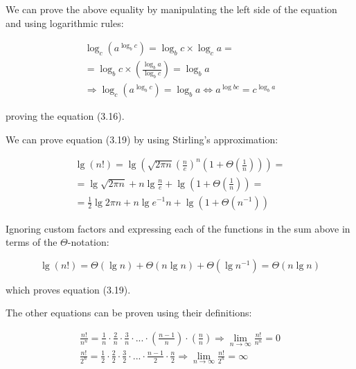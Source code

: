 \documentclass[8pt,a4paper]{article}
\begin{document}
We can prove the above equality by manipulating the left side of the equation and
using logarithmic rules:

\begin{equation*}
  \begin{split}
    \log_{c}(a^{\log_{b}c}) = \log_{b}c \times \log_{c}a = \\
    = \log_{b}c \times \left(\frac{\log_{b}a}{\log_{b}c}\right) = \log_{b}a \\
    \Rightarrow \log_{c}(a^{\log_{b}c}) = \log_{b}a \iff a^{\log{b}c} = c^{\log_{b}a}
  \end{split}
\end{equation*}

proving the equation (3.16).


We can prove equation (3.19) by using Stirling's approximation:

\begin{equation*}
  \begin{split}
    \lg(n!) = \lg \left(\sqrt{2 \pi n} \left(\frac{n}{e}\right)^{n} \left(1 + \Theta \left(\frac{1}{n}\right)\right)\right) = \\
    = \lg \sqrt{2 \pi n} + n \lg \frac{n}{e} + \lg \left(1 + \Theta \left(\frac{1}{n}\right) \right) = \\
    = \frac{1}{2}\lg 2 \pi n + n \lg e^{-1}n + \lg (1 + \Theta(n^{-1}))
  \end{split}
\end{equation*}

Ignoring custom factors and expressing each of the functions in the sum above in terms of the $\Theta$-notation:

\begin{equation*}
  \lg(n!) = \Theta(\lg n) + \Theta(n \lg n) + \Theta(\lg n^{-1}) = \Theta(n \lg n)
\end{equation*}

which proves equation (3.19).

The other equations can be proven using their definitions:

\begin{equation*}
  \begin{split}
    \frac{n!}{n^{n}} = \frac{1}{n} \cdot \frac{2}{n} \cdot \frac{3}{n}
      \cdot ... \cdot \left(\frac{n - 1}{n}\right) \cdot \left(\frac{n}{n}\right)
      \Rightarrow \lim_{n \to \infty} \frac{n!}{n^{n}} = 0 \\
    \frac{n!}{2^{n}} = \frac{1}{2} \cdot \frac{2}{2} \cdot \frac{3}{2}
      \cdot ... \cdot \frac{n - 1}{2} \cdot \frac{n}{2}
      \Rightarrow \lim_{n \to \infty} \frac{n!}{2^{n}} = \infty
  \end{split}
\end{equation*}
\end{document}
